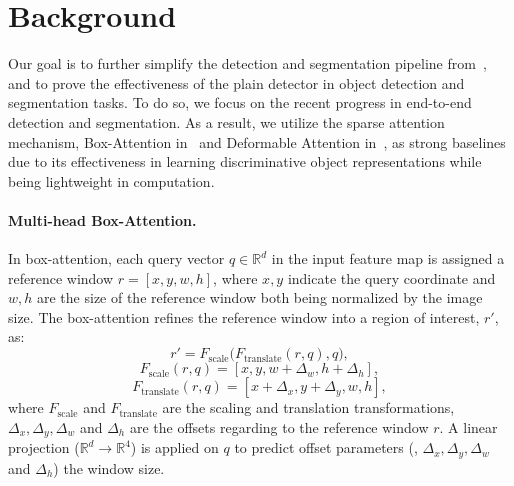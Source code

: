 \section{Background}
\label{sec:background}
Our goal is to further simplify the detection and segmentation pipeline from~\cite{zhu2021deformable,li2022vitdet,nguyen2022boxer}, and to prove the effectiveness of the plain detector in object detection and segmentation tasks. To do so, we focus on the recent progress in end-to-end detection and segmentation. As a result, we utilize the sparse attention mechanism, Box-Attention in~\cite{nguyen2022boxer} and Deformable Attention in~\cite{zhu2021deformable}, as strong baselines due to its effectiveness in learning discriminative object representations while being lightweight in computation.


\paragraph{Multi-head Box-Attention.} In box-attention, each query vector $q \in \mathbb{R}^d$ in the input feature map is assigned a reference window $r {=} [x, y, w, h]$, where $x, y$ indicate the query coordinate and $w, h$ are the size of the reference window both being normalized by the image size. The box-attention refines the reference window into a region of interest, $r'$, as:
%
\begin{equation}
    r' = F_\text{scale}\big(F_\text{translate}(r, q), q\big), 
\end{equation}
\begin{equation}
    F_\text{scale}(r, q) = [x, y, w + \Delta_w, h + \Delta_h], 
\end{equation}
\begin{equation}
    F_\text{translate}(r, q) = [x + \Delta_x, y + \Delta_y, w, h],
\end{equation}
%
where $F_\text{scale}$ and $F_\text{translate}$ are the scaling and translation transformations, $\Delta_x, \Delta_y, \Delta_w$ and $\Delta_h$ are the offsets regarding to the reference window $r$. A linear projection ($\mathbb{R}^d \rightarrow \mathbb{R}^{4}$) is applied on $q$ to predict offset parameters (\ie, $\Delta_x, \Delta_y, \Delta_w$ and $\Delta_h$) \wrt the window size.

